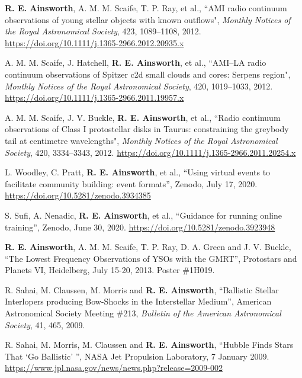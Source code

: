 \begin{cvpubs}
{\begin{cvetar}
        \item {\textbf{R. E. Ainsworth}, A. M. M. Scaife, T. P. Ray, et al., ``AMI radio continuum observations of young stellar objects with known outflows", \textit{Monthly Notices of the Royal Astronomical Society}, 423, 1089--1108, 2012. \url{https://doi.org/10.1111/j.1365-2966.2012.20935.x}}
        \item {A. M. M. Scaife, J. Hatchell, \textbf{R. E. Ainsworth}, et al., ``AMI--LA radio continuum observations of Spitzer c2d small clouds and cores: Serpens region", \textit{Monthly Notices of the Royal Astronomical Society}, 420, 1019--1033, 2012. \url{https://doi.org/10.1111/j.1365-2966.2011.19957.x}}
        \item {A. M. M. Scaife, J. V. Buckle, \textbf{R. E. Ainsworth}, et al., ``Radio continuum observations of Class I protostellar disks in Taurus: constraining the greybody tail at centimetre wavelengths", \textit{Monthly Notices of the Royal Astronomical Society}, 420, 3334--3343, 2012. \url{https://doi.org/10.1111/j.1365-2966.2011.20254.x}}
      \end{cvetar}
    }
\end{cvpubs}

\begin{cvpubs}
  \cvpub
    {
      \begin{cvetar}
        \item {L. Woodley, C. Pratt, \textbf{R. E. Ainsworth}, et al., ``Using virtual events to facilitate community building: event formats'', Zenodo, July 17, 2020. \url{https://doi.org/10.5281/zenodo.3934385}}
        \item {S. Sufi, A. Nenadic, \textbf{R. E. Ainsworth}, et al., ``Guidance for running online training'', Zenodo, June 30, 2020. \url{https://doi.org/10.5281/zenodo.3923948}}
        \item {\textbf{R. E. Ainsworth}, A. M. M. Scaife, T. P. Ray, D. A. Green and J. V. Buckle, ``The Lowest Frequency Observations of YSOs with the GMRT'', Protostars and Planets VI, Heidelberg, July 15-20, 2013. Poster \#1H019.}
        \item {R. Sahai, M. Claussen, M. Morris and \textbf{R. E. Ainsworth}, ``Ballistic Stellar Interlopers producing Bow-Shocks in the Interstellar Medium'', American Astronomical Society Meeting \#213, \textit{Bulletin of the American Astronomical Society}, 41, 465, 2009.}
      \end{cvetar}
    }
\end{cvpubs}

\begin{cvpubs}
  \cvpub
    {
      \begin{cvetar}
        \item {R. Sahai, M. Morris, M. Claussen and \textbf{R. E. Ainsworth}, ``Hubble Finds Stars That `Go Ballistic' '', NASA Jet Propulsion Laboratory, 7 January 2009. \url{https://www.jpl.nasa.gov/news/news.php?release=2009-002}}
      \end{cvetar}
    }    

\end{cvpubs}

